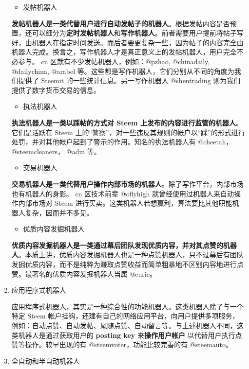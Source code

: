 \documentclass[]{ctexbook}
\providecommand{\tightlist}{%
  \setlength{\itemsep}{0pt}\setlength{\parskip}{0pt}}
\begin{document}
\begin{enumerate}
  \begin{itemize}
  \tightlist
  \item
    发帖机器人
  \end{itemize}

  \textbf{发帖机器人是一类代替用户进行自动发帖子的机器人}。根据发帖内容是否预置，还可以细分为\textbf{定时发帖机器人}和\textbf{写作机器人}。前者需要用户提前将帖子写好，由机器人在指定时间发送。而后者要更复杂一些，因为帖子的内容完全由机器人完成。换言之，写作机器人才是真正意义上的发帖机器人，用户完全不必参与。 cn 区就有不少发帖机器人，例如：@pzhao, @chinadaily, @dailychina, @arabel 等。这些都是写作机器人，它们分别从不同的角度为我们提供了 Steemit 的一些统计信息。另一写作机器人 @shentrading 则为我们提供了数字货币交易的信息。

  \begin{itemize}
  \tightlist
  \item
    执法机器人
  \end{itemize}

  \textbf{执法机器人是一类以踩帖的方式对 Steem 上发布的内容进行监管的机器人}。它们是活跃在 Steem 上的``警察''，对一些违反其规则的帐户以``踩''的形式进行处罚，并对其他帐户起到了警示的作用。知名的执法机器人有 @cheetah， @steemcleaners， @adm 等。

  \begin{itemize}
  \tightlist
  \item
    交易机器人
  \end{itemize}

  \textbf{交易机器人是一类代替用户操作内部市场的机器人}。除了写作平台，内部市场也有机器人的身影。 cn 区技术前辈 @oflyhigh 就曾经使用过机器人来自动操作内部市场对 Steem 进行买卖。这类机器人若想赢利，算法要比其他职能机器人复杂，因而并不多见。

  \begin{itemize}
  \tightlist
  \item
    优质内容发掘机器人
  \end{itemize}

  \textbf{优质内容发掘机器人是一类通过幕后团队发现优质内容，并对其点赞的机器人}。本质上讲，优质内容发掘机器人也是一种点赞机器人，只不过幕后有团队发掘优质内容，而不是纯粹为赚取点赞收益而简单粗暴地不区别内容地进行点赞。最著名的优质内容发掘机器人当属 @curie。
\item
  应用程序式机器人

  应用程序式机器人，其实是一种综合性的功能机器人。这类机器人除了与一个特定 Steem 帐户挂钩，还建有自己的网络应用平台，向用户提供多项服务，例如：自动点赞、自动发帖、尾随点赞、自动留言等。与上述机器人不同，这类机器人是通过获取用户的 \textbf{posting key} 来\textbf{操作用户帐户} 以代替用户执行点赞等操作。较早出现的有 @steemvoter，功能比较完善的有 @steemauto。
\item
  全自动和半自动机器人


\end{enumerate}
\end{document}
